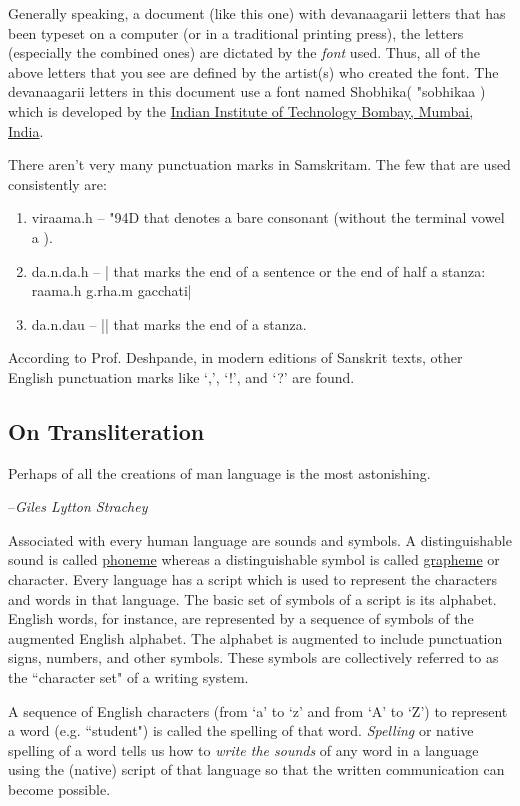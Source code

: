 \documentclass[a4paper, 12pt]{article}
\newcommand \sans[1]{
    \textsanskrit{#1}
}
\begin{document}
Generally speaking, a document (like this one) with \sans{devanaagarii} letters that has been typeset on a computer (or in a traditional printing press), the letters (especially the combined ones) are dictated by the \emph{font} used. Thus, all of the above letters that you see are defined by the artist(s) who created the font. The \sans{devanaagarii} letters in this document use a font named Shobhika(\sans{"sobhikaa}) which is developed by the \href{https://github.com/Sandhi-IITBombay/Shobhika}{Indian Institute of Technology Bombay, Mumbai, India}.

There aren't very many punctuation marks in Samskritam. The few that are used consistently are:
\begin{enumerate}
    \item \sans{viraama.h -- \char"94D} that denotes a bare consonant (without the terminal vowel \sans{a}).
    \item \sans{da.n.da.h -- |} that marks the end of a sentence or the end of half a stanza: \sans{raama.h g.rha.m gacchati|}
    \item \sans{da.n.dau -- ||} that marks the end of a stanza.
\end{enumerate}

According to Prof. Deshpande, in modern editions of Sanskrit texts, other English punctuation marks like `,', `!', and `?' are found.

\subsection{On Transliteration}
\epigraph
{
    Perhaps of all the creations of man language is the most astonishing.
}
{
    --\textit{Giles Lytton Strachey \cite{wap}}
}

Associated with every human language are sounds and symbols. A distinguishable sound is called \href{https://en.m.wikipedia.org/wiki/Phoneme}{phoneme} whereas a distinguishable symbol is called \href{https://en.m.wikipedia.org/wiki/Grapheme}{grapheme} or character. Every language has a script which is used to represent the characters and words in that language. The basic set of symbols of a script is its alphabet. English words, for instance, are represented by a sequence of symbols of the augmented English alphabet. The alphabet is augmented to include punctuation signs, numbers, and other symbols. These symbols are collectively referred to as the ``character set" of a writing system. 

A sequence of English characters (from `a' to `z' and from `A' to `Z') to represent a word (e.g. ``student") is called the spelling of that word. \emph{Spelling} or native spelling of a word tells us how to \emph{write the sounds} of any word in a language using the (native) script of that language so that the written communication can become possible. 
\end{document}
